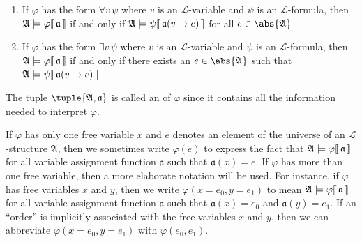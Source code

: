 \begin{dfn}[Satisfaction]
\begin{enumerate}[topsep=2pt,label=\textup{\texttt{(\alph*)}}]
            then \( \folwffsatisfaction{\mathfrak{A}}{\varphi}{\mathfrak{a}} \) if and only if \( \folwffsatisfaction{\mathfrak{A}}{\psi}{\mathfrak{a}} \)
            or \( \folwffsatisfaction{\mathfrak{A}}{\phi}{\mathfrak{a}} \)
        \item If \( \varphi \) has the form \( \forall v \, \psi \) where \( v \) is an \( \mathcal{L} \)-variable and \( \psi \) is an \( \mathcal{L} \)-formula,
            then \( \folwffsatisfaction{\mathfrak{A}}{\varphi}{\mathfrak{a}} \) if and only if
            \( \folwffsatisfaction{\mathfrak{A}}{\psi}{ \folmodifiedvariableassignmentfunction{\mathfrak{a}}{v}{e} } \) for all \( e \in \abs{\mathfrak{A}} \)
        \item If \( \varphi \) has the form \( \exists v \, \psi \) where \( v \) is an \( \mathcal{L} \)-variable and \( \psi \) is an \( \mathcal{L} \)-formula,
            then \( \folwffsatisfaction{\mathfrak{A}}{\varphi}{\mathfrak{a}} \) if and only if there exists an \( e \in \abs{\mathfrak{A}} \) such that
            \( \folwffsatisfaction{\mathfrak{A}}{\psi}{ \folmodifiedvariableassignmentfunction{\mathfrak{a}}{v}{e} } \)
    \end{enumerate}
    The tuple \( \tuple{\mathfrak{A}, \mathfrak{a}} \) is called an  of \( \varphi \) since it contains all the information needed to
    interpret \( \varphi \).
\end{dfn}

\begin{notation}
    If \( \varphi \) has only one free variable \( x \) and \( e \) denotes an element of the universe of an \( \mathcal{L} \)-structure \( \mathfrak{A} \),
    then we sometimes write \( \varphi(e) \) to express the fact that \( \folwffsatisfaction{\mathfrak{A}}{\varphi}{\mathfrak{a}} \) for all variable assignment
    function \( \mathfrak{a} \) such that \( \mathfrak{a}(x) = e \). If \( \varphi \) has more than one free variable, then a more elaborate notation will be used.
    For instance, if \( \varphi \) has free variables \( x \) and \( y \), then we write \( \varphi(x = e_{0}, y = e_{1}) \) to mean
    \( \folwffsatisfaction{\mathfrak{A}}{\varphi}{\mathfrak{a}} \) for all variable assignment function \( \mathfrak{a} \) such that
    \( \mathfrak{a}(x) = e_{0} \) and \( \mathfrak{a}(y) = e_{1} \).
    If an ``order'' is implicitly associated with the free variables \( x \) and \( y \), then we can abbreviate
    \( \varphi(x = e_{0}, y = e_{1}) \) with \( \varphi(e_{0}, e_{1}) \).
\end{notation}

